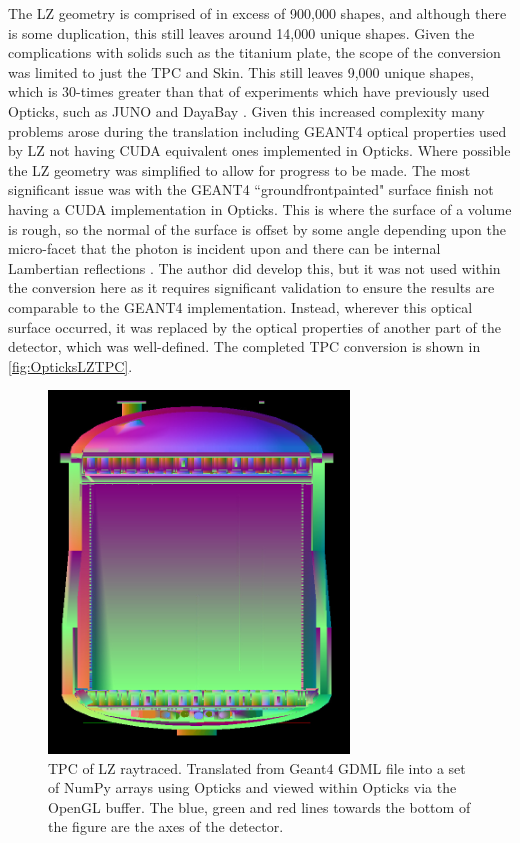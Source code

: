 \par
The LZ geometry is comprised of in excess of 900,000 shapes, and although there is some duplication, this still leaves around 14,000 unique shapes.
Given the complications with solids such as the titanium plate, the scope of the conversion was limited to just the TPC and Skin.
This still leaves 9,000 unique shapes, which is 30-times greater than that of experiments which have previously used Opticks, such as JUNO and DayaBay \cite{Opticks_CHEP_2021_ref}.
Given this increased complexity many problems arose during the translation including GEANT4 optical properties used by LZ not having CUDA equivalent ones implemented in Opticks.
Where possible the LZ geometry was simplified to allow for progress to be made.
The most significant issue was with the GEANT4 ``groundfrontpainted" surface finish not having a CUDA implementation in Opticks.
This is where the surface of a volume is rough, so the normal of the surface is offset by some angle depending upon the micro-facet that the photon is incident upon and there can be internal Lambertian reflections \cite{optical_photons_in_geant4_ref}.
The author did develop this, but it was not used within the conversion here as it requires significant validation to ensure the results are comparable to the GEANT4 implementation.
Instead, wherever this optical surface occurred, it was replaced by the optical properties of another part of the detector, which was well-defined.
The completed TPC conversion is shown in \autoref{fig:OpticksLZTPC}.
\begin{figure}
\includegraphics[width=8cm]{Figures/Simulations/LZ_In_Opticks.png}
\centering
\caption{TPC of LZ raytraced. Translated from Geant4 GDML file into a set of NumPy arrays using Opticks and viewed within Opticks via the OpenGL buffer.
The blue, green and red lines towards the bottom of the figure are the axes of the detector.}
\label{fig:OpticksLZTPC}
\end{figure}

